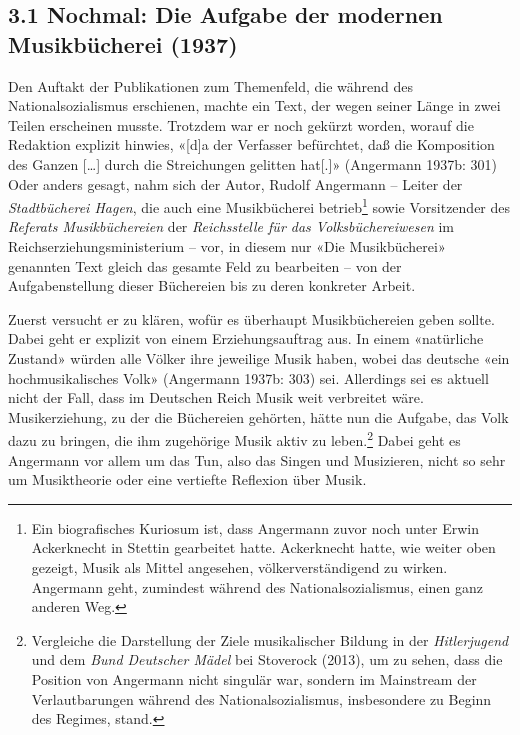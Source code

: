 \documentclass[a4paper,
fontsize=11pt,
oneside,
numbers=noperiodatend,
parskip=half-,
bibliography=totoc,
final
]{scrartcl}
\begin{document}
\hypertarget{nochmal-die-aufgabe-der-modernen-musikbuxfccherei-1937}{%
\subsection{3.1 Nochmal: Die Aufgabe der modernen Musikbücherei
(1937)}\label{nochmal-die-aufgabe-der-modernen-musikbuxfccherei-1937}}

Den Auftakt der Publikationen zum Themenfeld, die während des
Nationalsozialismus erschienen, machte ein Text, der wegen seiner Länge
in zwei Teilen erscheinen musste. Trotzdem war er noch gekürzt worden,
worauf die Redaktion explizit hinwies, «{[}d{]}a der Verfasser
befürchtet, daß die Komposition des Ganzen {[}\ldots{]} durch die
Streichungen gelitten hat{[}.{]}» (Angermann 1937b: 301) Oder anders
gesagt, nahm sich der Autor, Rudolf Angermann -- Leiter der
\emph{Stadtbücherei Hagen}, die auch eine Musikbücherei
betrieb\footnote{Ein biografisches Kuriosum ist, dass Angermann zuvor
  noch unter Erwin Ackerknecht in Stettin gearbeitet hatte. Ackerknecht
  hatte, wie weiter oben gezeigt, Musik als Mittel angesehen,
  völkerverständigend zu wirken. Angermann geht, zumindest während des
  Nationalsozialismus, einen ganz anderen Weg.} sowie Vorsitzender des
\emph{Referats Musikbüchereien} der \emph{Reichsstelle für das
Volksbüchereiwesen} im Reichserziehungsministerium -- vor, in diesem nur
«Die Musikbücherei» genannten Text gleich das gesamte Feld zu bearbeiten
-- von der Aufgabenstellung dieser Büchereien bis zu deren konkreter
Arbeit.

Zuerst versucht er zu klären, wofür es überhaupt Musikbüchereien geben
sollte. Dabei geht er explizit von einem Erziehungsauftrag aus. In einem
«natürliche Zustand» würden alle Völker ihre jeweilige Musik haben,
wobei das deutsche «ein hochmusikalisches Volk» (Angermann 1937b: 303)
sei. Allerdings sei es aktuell nicht der Fall, dass im Deutschen Reich
Musik weit verbreitet wäre. Musikerziehung, zu der die Büchereien
gehörten, hätte nun die Aufgabe, das Volk dazu zu bringen, die ihm
zugehörige Musik aktiv zu leben.\footnote{Vergleiche die Darstellung der
  Ziele musikalischer Bildung in der \emph{Hitlerjugend} und dem
  \emph{Bund Deutscher Mädel} bei Stoverock (2013), um zu sehen, dass
  die Position von Angermann nicht singulär war, sondern im Mainstream
  der Verlautbarungen während des Nationalsozialismus, insbesondere zu
  Beginn des Regimes, stand.} Dabei geht es Angermann vor allem um das
Tun, also das Singen und Musizieren, nicht so sehr um Musiktheorie oder
eine vertiefte Reflexion über Musik.
\end{document}
